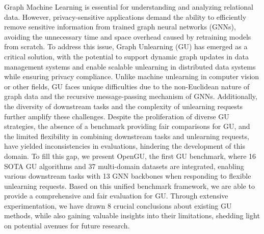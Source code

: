 Graph Machine Learning is essential for understanding and analyzing relational data. However, privacy-sensitive applications demand the ability to efficiently remove sensitive information from trained graph neural networks (GNNs), avoiding the unnecessary time and space overhead caused by retraining models from scratch.
To address this issue, Graph Unlearning (GU) has emerged as a critical solution, with the potential to support dynamic graph updates in data management systems and enable scalable unlearning in distributed data systems while ensuring privacy compliance.
Unlike machine unlearning in computer vision or other fields, GU faces unique difficulties due to the non-Euclidean nature of graph data and the recursive message-passing mechanism of GNNs. Additionally, the diversity of downstream tasks and the complexity of unlearning requests further amplify these challenges.
Despite the proliferation of diverse GU strategies, the absence of a benchmark providing fair comparisons for GU, and the limited flexibility in combining downstream tasks and unlearning requests, have yielded inconsistencies in evaluations, hindering the development of this domain. To fill this gap, we present OpenGU, the first GU benchmark, where 16 SOTA GU algorithms and 37 multi-domain datasets are integrated, enabling various downstream tasks with 13 GNN backbones when responding to flexible unlearning requests. 
 Based on this unified benchmark framework, we are able to provide a comprehensive and fair evaluation for GU. Through extensive experimentation, we have drawn $8$ crucial conclusions about existing GU methods, while also gaining valuable insights into their limitations, shedding light on potential avenues for future research.
